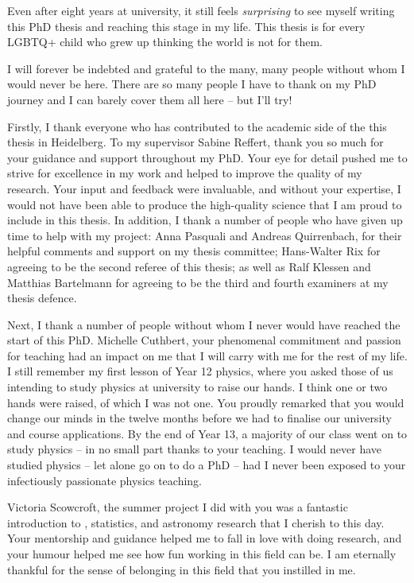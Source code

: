 %
\label{sec:acknowledgements}

Even after eight years at university, it still feels \emph{surprising} to see myself writing this PhD thesis and reaching this stage in my life. This thesis is for every LGBTQ+ child who grew up thinking the world is not for them.

I will forever be indebted and grateful to the many, many people without whom I would never be here. There are so many people I have to thank on my PhD journey and I can barely cover them all here -- but I'll try!

Firstly, I thank everyone who has contributed to the academic side of the this thesis in Heidelberg. To my supervisor Sabine Reffert, thank you so much for your guidance and support throughout my PhD. Your eye for detail pushed me to strive for excellence in my work and helped to improve the quality of my research. Your input and feedback were invaluable, and without your expertise, I would not have been able to produce the high-quality science that I am proud to include in this thesis. In addition, I thank a number of people who have given up time to help with my project: Anna Pasquali and Andreas Quirrenbach, for their helpful comments and support on my thesis committee; Hans-Walter Rix for agreeing to be the second referee of this thesis; as well as Ralf Klessen and Matthias Bartelmann for agreeing to be the third and fourth examiners at my thesis defence. 

Next, I thank a number of people without whom I never would have reached the start of this PhD. Michelle Cuthbert, your phenomenal commitment and passion for teaching had an impact on me that I will carry with me for the rest of my life. I still remember my first lesson of Year 12 physics, where you asked those of us intending to study physics at university to raise our hands. I think one or two hands were raised, of which I was not one. You proudly remarked that you would change our minds in the twelve months before we had to finalise our university and course applications. By the end of Year 13, a majority of our class went on to study physics -- in no small part thanks to your teaching. I would never have studied physics -- let alone go on to do a PhD -- had I never been exposed to your infectiously passionate physics teaching.

Victoria Scowcroft, the summer project I did with you was a fantastic introduction to \gaia, statistics, and astronomy research that I cherish to this day. Your mentorship and guidance helped me to fall in love with doing research, and your humour helped me see how fun working in this field can be. I am eternally thankful for the sense of belonging in this field that you instilled in me.

